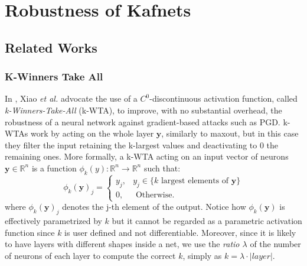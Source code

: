 \documentclass[LaM,binding=0.6cm]{./packages/sapthesis/sapthesis}
\begin{document}
    
\part{Robustness of Kafnets}

    \chapter{Related Works}
    \label{chap:5}
       
    \section{K-Winners Take All}
    In \cite{kwta}, Xiao \textit{et al.} advocate the use of a $C^0$-discontinuous activation function, called
    \textit{k-Winners-Take-All} (k-WTA), to improve, with no substantial overhead, the robustness of a neural network against gradient-based attacks such as PGD.
    k-WTAs work by acting on the whole layer $\mathbf{y}$, similarly to maxout, but in this case they filter the input retaining the k-largest values and deactivating to 0 the remaining ones.
    More formally, a k-WTA acting on an input vector of neurons $\mathbf{y} \in \mathbb{R}^{n}$ is a function $\phi_k(y) : \mathbb{R}^n \to \mathbb{R}^n$ such that:
    \begin{equation}
        \phi_k(\mathbf{y})_j = \left\{\begin{array}{ll}
            y_{j}, & y_{j} \in\{k \text { largest elements of } \boldsymbol{y}\} \\
            0, & \text { Otherwise. }
            \end{array}\right. 
    \end{equation}
    where $\phi_k(\mathbf{y})_j$ denotes the j-th element of the output. Notice how $\phi_k(\mathbf{y})$ is effectively 
    parametrized by $k$ but it cannot be regarded as a parametric activation function since $k$ is user defined and not
    differentiable. Moreover, since it is likely to have layers with different shapes inside a net, we use the \textit{ratio $\lambda$}
    of the number of neurons of each layer to compute the correct $k$, simply as $k = \lambda \cdot |layer|$.
\end{document}

